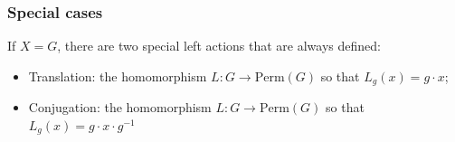 \subsubsection{Special cases}
If $X=G$, there are two special left actions that are always defined:
\begin{itemize}
    \item Translation: the homomorphism $L: G \to \text{Perm}(G)$ so that
        $L_g(x)=g\cdot x$;
    \item Conjugation: the homomorphism $L:G\to\text{Perm}(G)$ so that
        $L_g(x)=g\cdot x\cdot g^{-1}$
\end{itemize}
